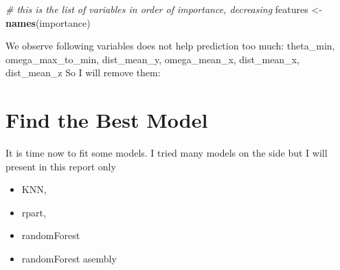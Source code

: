 \documentclass[]{article}
\newenvironment{Shaded}{\begin{snugshade}}{\end{snugshade}}
\newcommand{\CommentTok}[1]{\textcolor[rgb]{0.56,0.35,0.01}{\textit{#1}}}
\newcommand{\KeywordTok}[1]{\textcolor[rgb]{0.13,0.29,0.53}{\textbf{#1}}}
\newcommand{\NormalTok}[1]{#1}
\newcommand{\OperatorTok}[1]{\textcolor[rgb]{0.81,0.36,0.00}{\textbf{#1}}}
\newcommand{\StringTok}[1]{\textcolor[rgb]{0.31,0.60,0.02}{#1}}
\providecommand{\tightlist}{%
  \setlength{\itemsep}{0pt}\setlength{\parskip}{0pt}}
\begin{document}
\begin{Shaded}
\begin{Highlighting}[]
\CommentTok{# this is the list of variables in order of importance, decreasing}
\NormalTok{features <-}\StringTok{ }\KeywordTok{names}\NormalTok{(importance)}
\end{Highlighting}
\end{Shaded}

We observe following variables does not help prediction too much:
theta\_min, omega\_max\_to\_min, dist\_mean\_y, omega\_mean\_x,
dist\_mean\_x, dist\_mean\_z So I will remove them:

\begin{Shaded}
\end{Shaded}

\hypertarget{find-the-best-model}{%
\section{Find the Best Model}\label{find-the-best-model}}

It is time now to fit some models. I tried many models on the side but I
will present in this report only

\begin{itemize}
\tightlist
\item
  KNN,
\item
  rpart,\\
\item
  randomForest
\item
  randomForest asembly
\end{itemize}
\end{document}
